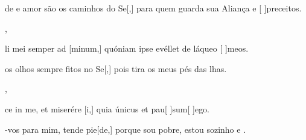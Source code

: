 {    {\item {}de e amor são os caminhos do Se[,] para quem guarda sua Aliança e [ ]{pre}{cei}tos.~\Antiphona},
  {\item {}li mei semper ad [minum,] quóniam ipse evéllet de láqueo [ ]{me}os.~\Antiphona}%
    {\item {} os olhos sempre fitos no Se[,] pois tira os meus pés das lhas.~\Antiphona},
  {\item {}ce in me, et miserére [i,] quia únicus et pau[ ]{sum}[ ]{e}go.~\Antiphona}%
    {\item {}-vos para mim, tende pie[de,] porque sou pobre, estou sozinho e .~\Antiphona}
}